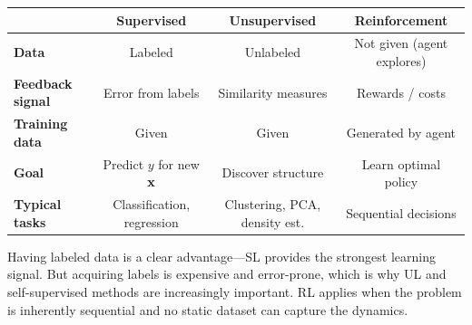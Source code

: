 \begin{center}
\renewcommand{\arraystretch}{1.3}
\begin{tabular}{@{} l c c c @{}}
\toprule
& \textbf{Supervised} & \textbf{Unsupervised} & \textbf{Reinforcement} \\
\midrule
\textbf{Data}            & Labeled       & Unlabeled       & Not given (agent explores) \\
\textbf{Feedback signal} & Error from labels & Similarity measures & Rewards / costs \\
\textbf{Training data}   & Given         & Given           & Generated by agent \\
\textbf{Goal}            & Predict $y$ for new $\mathbf{x}$ & Discover structure & Learn optimal policy \\
\textbf{Typical tasks}   & Classification, regression & Clustering, PCA, density est. & Sequential decisions \\
\bottomrule
\end{tabular}
\end{center}

\begin{remark}
Having labeled data is a clear advantage---SL provides the strongest learning signal. But acquiring labels is expensive and error-prone, which is why UL and self-supervised methods are increasingly important. RL applies when the problem is inherently sequential and no static dataset can capture the dynamics.
\end{remark}
